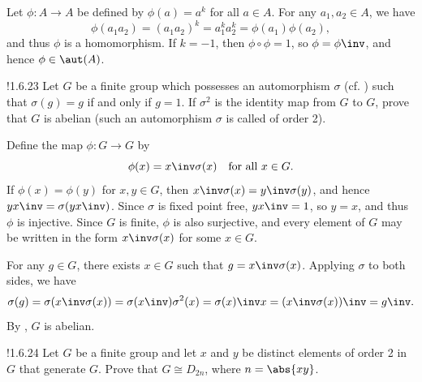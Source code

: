 \begin{sol}
    Let $\phi \colon A \to A$ be defined by $\phi(a) = a^k$ for all $a \in A$.
	For any $a_1, a_2 \in A$, we have
    \[
    	\phi(a_1a_2) = (a_1a_2)^k = a_1^k a_2^k = \phi(a_1)\phi(a_2),
    \]
    and thus $\phi$ is a homomorphism.
    If $k = -1$, then $\phi \circ \phi = 1$, so $\phi = \phi\inv$, and hence $\phi \in \aut(A)$.
\end{sol}

\begin{exercise}!{1.6.23}
    Let $G$ be a finite group which possesses an automorphism $\sigma$ (cf. ) such that $\sigma(g) = g$ if and only if $g = 1$.
	If $\sigma^2$ is the identity map from $G$ to $G$, prove that $G$ is abelian (such an automorphism $\sigma$ is called  of order 2).
\end{exercise}

\begin{sol}
    Define the map $\phi \colon G \to G$ by
    \[
        \phi(x) = x\inv \sigma(x) \quad \text{for all } x \in G.
    \]
	If $\phi(x) = \phi(y)$ for $x, y \in G$, then $x\inv \sigma(x) = y\inv \sigma(y)$, and hence $yx\inv = \sigma(yx\inv)$.
	Since $\sigma$ is fixed point free, $yx\inv = 1$, so $y = x$, and thus $\phi$ is injective.
	Since $G$ is finite, $\phi$ is also surjective, and every element of $G$ may be written in the form $x\inv \sigma(x)$ for some $x \in G$.

    For any $g \in G$, there exists $x \in G$ such that $g = x\inv \sigma(x)$.
	Applying $\sigma$ to both sides, we have
    \[
    	\sigma(g) = \sigma(x\inv \sigma(x)) = \sigma(x\inv) \sigma^2(x) = \sigma(x)\inv x = (x\inv \sigma(x))\inv = g\inv.
    \]
    By , $G$ is abelian.
\end{sol}

\begin{exercise}!{1.6.24}
    Let $G$ be a finite group and let $x$ and $y$ be distinct elements of order 2 in $G$ that generate $G$.
	Prove that $G \cong D_{2n}$, where $n = \abs{xy}$.
\end{exercise}

